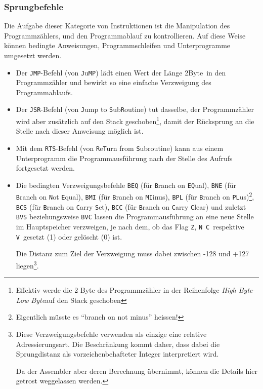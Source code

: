 \documentclass[11pt]{scrartcl}
\newcommand{\byte}{\unit{Byte}}
\newcommand{\nflag}{\texttt{N}}
\newcommand{\vflag}{\texttt{V}}
\newcommand{\zflag}{\texttt{Z}}
\newcommand{\cflag}{\texttt{C}}
\newcommand{\lobyte}{\emph{Low Byte}}
\newcommand{\hibyte}{\emph{High Byte}}
\begin{document}
\subsubsection{Sprungbefehle}
\label{sec:branch_instructions}

Die Aufgabe dieser Kategorie von Instruktionen ist die Manipulation
des Programmzählers, und den Programmablauf zu kontrollieren.
Auf diese Weise können bedingte Anweisungen,
Programmschleifen und Unterprogramme umgesetzt werden.

\begin{itemize}
\item Der \lstinline|JMP|-Befehl (von \texttt{J}u\texttt{MP}) lädt
  einen Wert der Länge 2\byte\ in den Programmzähler und bewirkt so
  eine einfache Verzweigung des Programmablaufs.
\item Der \lstinline|JSR|-Befehl (von \texttt{J}ump to
  \texttt{S}ub\texttt{R}outine) tut dasselbe, der Programmzähler wird aber
  zusätzlich auf den Stack geschoben\footnote{Effektiv werde die 2 Byte des
    Programmzähler in der Reihenfolge \hibyte-\lobyte auf den
    Stack geschoben}, damit der Rücksprung an die
  Stelle nach dieser Anweisung möglich ist.
\item Mit dem \lstinline|RTS|-Befehl (von \texttt{R}e\texttt{T}urn from
  \texttt{S}ubroutine) kann aus einem Unterprogramm die
  Programmausführung nach der Stelle des Aufrufs fortgesetzt werden.
\item Die bedingten Verzweigungsbefehle \lstinline|BEQ| (für
  \texttt{B}ranch on \texttt{EQ}ual), \lstinline|BNE| (für \texttt{B}ranch
  on \texttt{N}ot \texttt{E}qual), \lstinline|BMI| (für \texttt{B}ranch on
  \texttt{MI}inus), \lstinline|BPL| (für \texttt{B}ranch on
  \texttt{PL}us)\footnote{Eigentlich müsste es "`branch on not minus"'
    heissen!}, \lstinline|BCS| (für \texttt{B}ranch on \texttt{C}arry
  \texttt{S}et), \lstinline|BCC| (für \texttt{B}ranch on \texttt{C}arry
  \texttt{C}lear) und zuletzt \lstinline!BVS! beziehungsweise
  \lstinline!BVC! lassen die Programmausführung an eine neue Stelle im
  Hauptspeicher verzweigen, je nach dem, ob das Flag \zflag, \nflag\,
  \cflag\ respektive \vflag\ gesetzt (1) oder gelöscht (0) ist.

  Die Distanz zum Ziel der Verzweigung muss dabei zwischen -128 und
  +127 liegen\footnote{Diese Verzweigungsbefehle verwenden als einzige
    eine relative Adressierungsart. Die Beschränkung kommt daher, dass
    dabei die Sprungdistanz als vorzeichenbehafteter Integer interpretiert
    wird.

    Da der Assembler aber deren Berechnung übernimmt, können die
    Details hier getrost weggelassen werden.}.
\end{itemize}
\end{document}
